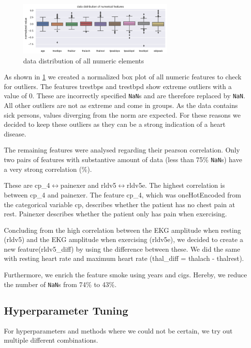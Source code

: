 \begin{figure}[h]
	\centering
	\includegraphics[width=0.7\textwidth]{images/dataDistribution.png}
	\caption{data distribution of all numeric elements}
	\label{fig:dataDistribution}
\end{figure}
As shown in \ref{fig:dataDistribution} we created a normalized box plot of all numeric features to check for outliers. The features trestbps and trestbpd show extreme outliers with a value of 0. These are incorrectly specified \texttt{NaN}s and are therefore replaced by \texttt{NaN}. All other outliers are not as extreme and come in groups. As the data contains sick persons, values diverging from the norm are expected. For these reasons we decided to keep these outliers as they can be a strong indication of a heart disease.

The remaining features were analysed regarding their pearson correlation. Only two pairs of features with substantive amount of data (less than 75\% \texttt{NaN}s) have a very strong correlation (\%).  

These are cp\_4$\leftrightarrow$painexer and rldv5$\leftrightarrow$rldv5e. The highest correlation is between cp\_4 and painexer. The feature cp\_4, which was oneHotEncoded from the categorical variable cp, describes whether the patient has no chest pain at rest. Painexer describes whether the patient only has pain when exercising. 

Concluding from the high correlation between the EKG amplitude when resting (rldv5) and the EKG amplitude when exercising (rldv5e), we decided to create a new feature(rldv5\_diff) by using the difference between these. We did the same with resting heart rate and maximum heart rate (thal\_diff = thalach - thalrest). 

Furthermore, we enrich the feature smoke using years and cigs. Hereby, we reduce the number of \texttt{NaN}s from 74\% to 43\%. 

\subsection{Hyperparameter Tuning }
For hyperparameters and methods where we could not be certain, we try out multiple different combinations.

